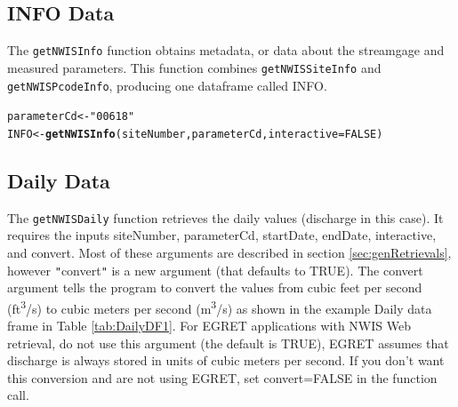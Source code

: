 \documentclass[a4paper,11pt]{article}\usepackage[]{graphicx}\usepackage[]{color}
\makeatletter
\newcommand{\hlnum}[1]{\textcolor[rgb]{0.686,0.059,0.569}{#1}}%
\newcommand{\hlstr}[1]{\textcolor[rgb]{0.192,0.494,0.8}{#1}}%
\newcommand{\hlstd}[1]{\textcolor[rgb]{0.345,0.345,0.345}{#1}}%
\newcommand{\hlkwb}[1]{\textcolor[rgb]{0.69,0.353,0.396}{#1}}%
\newcommand{\hlkwc}[1]{\textcolor[rgb]{0.333,0.667,0.333}{#1}}%
\newcommand{\hlkwd}[1]{\textcolor[rgb]{0.737,0.353,0.396}{\textbf{#1}}}%
\newenvironment{kframe}{%
 \def\at@end@of@kframe{}%
 \ifinner\ifhmode%
  \def\at@end@of@kframe{\end{minipage}}%
  \begin{minipage}{\columnwidth}%
 \fi\fi%
 \def\FrameCommand##1{\hskip\@totalleftmargin \hskip-\fboxsep
 \colorbox{shadecolor}{##1}\hskip-\fboxsep
     \hskip-\linewidth \hskip-\@totalleftmargin \hskip\columnwidth}%
 \MakeFramed {\advance\hsize-\width
   \@totalleftmargin\z@ \linewidth\hsize
   \@setminipage}}%
 {\par\unskip\endMakeFramed%
 \at@end@of@kframe}
\newenvironment{knitrout}{}{} %
\makeatother
\begin{document}
\subsection{INFO Data}
\label{INFOsubsection}
The \texttt{getNWISInfo} function obtains metadata, or data about the streamgage and measured parameters. This function combines \texttt{getNWISSiteInfo} and \texttt{getNWISPcodeInfo}, producing one dataframe called INFO.

\begin{knitrout}
\color{fgcolor}\begin{kframe}
\begin{alltt}
\hlstd{parameterCd} \hlkwb{<-} \hlstr{"00618"}
\hlstd{INFO} \hlkwb{<-}\hlkwd{getNWISInfo}\hlstd{(siteNumber,parameterCd,} \hlkwc{interactive}\hlstd{=}\hlnum{FALSE}\hlstd{)}
\end{alltt}
\end{kframe}
\end{knitrout}


\FloatBarrier

\subsection{Daily Data}
\label{Dailysubsection}
The \texttt{getNWISDaily} function retrieves the daily values (discharge in this case).  It requires the inputs siteNumber, parameterCd, startDate, endDate, interactive, and convert. Most of these arguments are described in section \ref{sec:genRetrievals}, however \texttt{"}convert\texttt{"} is a new argument (that defaults to TRUE). The convert argument tells the program to convert the values from cubic feet per second (ft\textsuperscript{3}/s) to cubic meters per second (m\textsuperscript{3}/s) as shown in the example Daily data frame in Table \ref{tab:DailyDF1}. For EGRET applications with NWIS Web retrieval, do not use this argument (the default is TRUE), EGRET assumes that discharge is always stored in units of cubic meters per second. If you don't want this conversion and are not using EGRET, set convert=FALSE in the function call. 
\end{document}
